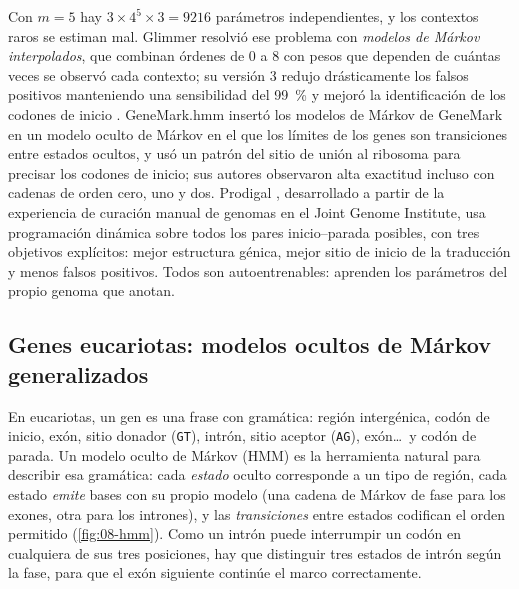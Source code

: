 Con $m=5$ hay $3\times4^5\times3=\num{9216}$ parámetros independientes, y los contextos raros se estiman mal. Glimmer resolvió ese problema con \emph{modelos de Márkov interpolados}, que combinan órdenes de 0 a 8 con pesos que dependen de cuántas veces se observó cada contexto; su versión 3 redujo drásticamente los falsos positivos manteniendo una sensibilidad del \SI{99}{\percent} y mejoró la identificación de los codones de inicio \parencite{c08-delcher2007}. GeneMark.hmm \parencite{c08-lukashin1998} insertó los modelos de Márkov de GeneMark en un modelo oculto de Márkov en el que los límites de los genes son transiciones entre estados ocultos, y usó un patrón del sitio de unión al ribosoma para precisar los codones de inicio; sus autores observaron alta exactitud incluso con cadenas de orden cero, uno y dos. Prodigal \parencite{c08-hyatt2010}, desarrollado a partir de la experiencia de curación manual de genomas en el Joint Genome Institute, usa programación dinámica sobre todos los pares inicio--parada posibles, con tres objetivos explícitos: mejor estructura génica, mejor sitio de inicio de la traducción y menos falsos positivos. Todos son autoentrenables: aprenden los parámetros del propio genoma que anotan.

\subsection{Genes eucariotas: modelos ocultos de Márkov generalizados}

En eucariotas, un gen es una frase con gramática: región intergénica, codón de inicio, exón, sitio donador (\texttt{GT}), intrón, sitio aceptor (\texttt{AG}), exón\ldots\ y codón de parada. Un modelo oculto de Márkov (HMM) es la herramienta natural para describir esa gramática: cada \emph{estado} oculto corresponde a un tipo de región, cada estado \emph{emite} bases con su propio modelo (una cadena de Márkov de fase para los exones, otra para los intrones), y las \emph{transiciones} entre estados codifican el orden permitido (\cref{fig:08-hmm}). Como un intrón puede interrumpir un codón en cualquiera de sus tres posiciones, hay que distinguir tres estados de intrón según la fase, para que el exón siguiente continúe el marco correctamente.

